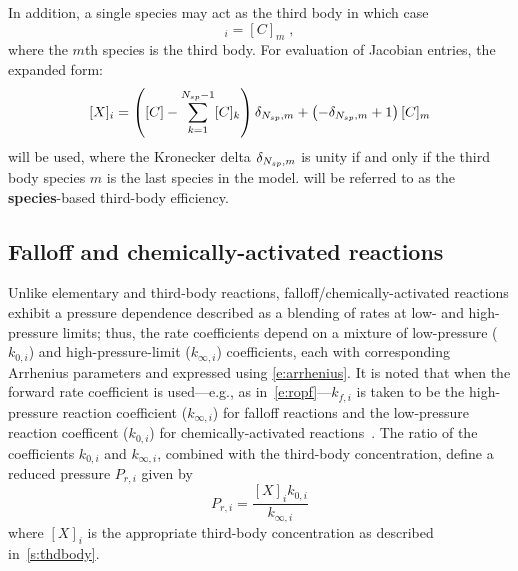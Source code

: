 \documentclass[12pt,number,sort&compress]{elsarticle}
\begin{document}
In addition, a single species may act as the third body in which case
\begin{equation}
 [X]_{i} = [C]_m\;,
\end{equation}
where the $m$th species is the third body.
For evaluation of Jacobian entries, the expanded form:
\begin{equation}
\label{e:thd_spec}
 [X]_{i}=\left([C] - \sum_{k=1}^{\ns/  - 1} [C]_{k}\right) \delta_{\ns/, m} + \left(- \delta_{\ns/, m} + 1\right) [C]_{m}
\end{equation}
will be used, where the Kronecker delta $\delta_{\ns/, m}$ is unity if and only if the third body species $m$ is the last species in the model.
 will be referred to as the \textbf{species}-based third-body efficiency.


\subsection{Falloff and chemically-activated reactions}
\label{s:falloff}
Unlike elementary and third-body reactions, falloff\slash chemically-activated reactions exhibit a pressure dependence described as a blending of rates at low- and high-pressure limits; thus, the rate coefficients depend on a mixture of low-pressure ($k_{0, i}$) and high-pressure-limit ($k_{\infty,i}$) coefficients, each with corresponding Arrhenius parameters and expressed using \cref{e:arrhenius}.
It is noted that when the forward rate coefficient is used---e.g., as in~\cref{e:ropf}---$k_{f, i}$ is taken to be the high-pressure reaction coefficient ($k_{\infty,i}$) for falloff reactions and the low-pressure reaction coefficent ($k_{0,i}$) for chemically-activated reactions~\cite{Goodwin:2015aa}.
The ratio of the coefficients $k_{0, i}$ and $k_{\infty, i}$, combined with the third-body concentration, define a reduced pressure $P_{r,i}$ given by
\begin{equation}
 \label{e:pr}
 P_{r, i}=\frac{[X]_{i} k_{0, i}}{k_{\infty, i}}
\end{equation}
where $[X]_{i}$ is the appropriate third-body concentration as described in~\cref{s:thdbody}.
\end{document}
